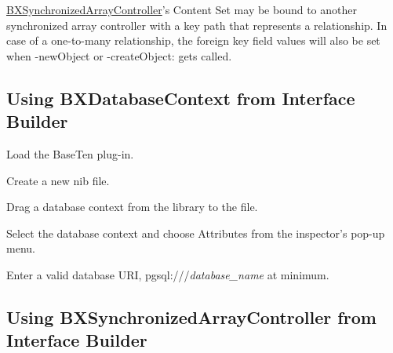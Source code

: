 \hyperlink{interface_b_x_synchronized_array_controller}{B\+X\+Synchronized\+Array\+Controller}'s Content Set may be bound to another synchronized array controller with a key path that represents a relationship. In case of a one-\/to-\/many relationship, the foreign key field values will also be set when -\/new\+Object or -\/create\+Object\+: gets called.\hypertarget{using_appkit_classes_using_bxdatabasecontext_ib}{}\subsection{Using B\+X\+Database\+Context from Interface Builder}\label{using_appkit_classes_using_bxdatabasecontext_ib}

\begin{DoxyEnumerate}
\item Load the Base\+Ten plug-\/in. 
\item Create a new nib file. 
\item Drag a database context from the library to the file. 
\item Select the database context and choose Attributes from the inspector's pop-\/up menu. 
\item Enter a valid database U\+R\+I, {\ttfamily pgsql\+:///{\itshape database\+\_\+name}} at minimum. 
\end{DoxyEnumerate}\hypertarget{using_appkit_classes_using_bxsynchronizedarraycontroller_ib}{}\subsection{Using B\+X\+Synchronized\+Array\+Controller from Interface Builder}\label{using_appkit_classes_using_bxsynchronizedarraycontroller_ib}


